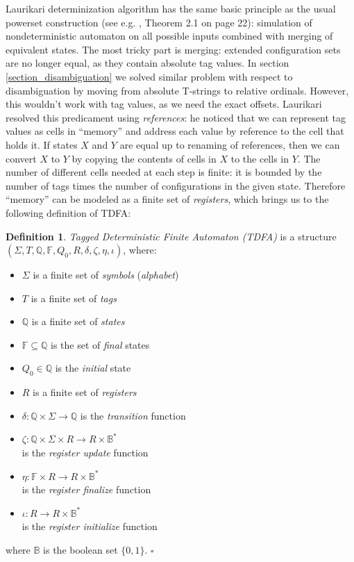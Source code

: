 \documentclass{article}
\newcommand{\YB}{\mathbb{B}}
\newcommand{\YF}{\mathbb{F}}
\newcommand{\YQ}{\mathbb{Q}}
\theoremstyle{definition}
\newtheorem{Xdef}{Definition}
\begin{document}
\begin{multicols}{2}
Laurikari determinization algorithm has the same basic principle as the usual powerset construction (see e.g. \cite{HU90}, Theorem 2.1 on page 22):
simulation of nondeterministic automaton on all possible inputs combined with merging of equivalent states.
The most tricky part is merging: extended configuration sets are no longer equal, as they contain absolute tag values.
In section \ref{section_disambiguation} we solved similar problem with respect to disambiguation
by moving from absolute T-strings to relative ordinals.
However, this wouldn't work with tag values, as we need the exact offsets.
Laurikari resolved this predicament using \emph{references}:
he noticed that we can represent tag values as cells in ``memory'' and address each value by reference to the cell that holds it.
If states $X$ and $Y$ are equal up to renaming of references,
then we can convert $X$ to $Y$ by copying the contents of cells in $X$ to the cells in $Y$.
The number of different cells needed at each step is finite:
it is bounded by the number of tags times the number of configurations in the given state.
Therefore ``memory'' can be modeled as a finite set of \emph{registers},
which brings us to the following definition of TDFA:

    \begin{Xdef}
    \emph{Tagged Deterministic Finite Automaton (TDFA)}
    is a structure $(\Sigma, T, \YQ, \YF, Q_0, R, \delta, \zeta, \eta, \iota)$, where:
    \begin{itemize}
    \setlength{\parskip}{0.5em}
        \item[] $\Sigma$ is a finite set of \emph{symbols} (\emph{alphabet})
        \item[] $T$ is a finite set of \emph{tags}
        \item[] $\YQ$ is a finite set of \emph{states}
        \item[] $\YF \subseteq \YQ$ is the set of \emph{final} states
        \item[] $Q_0 \in \YQ$ is the \emph{initial} state
        \item[] $R$ is a finite set of \emph{registers}
        \item[] $\delta: \YQ \times \Sigma \to \YQ$ is the \emph{transition} function
        \item[] $\zeta: \YQ \times \Sigma \times R \to R \times \YB^*$ \\
            is the \emph{register update} function
        \item[] $\eta: \YF \times R \to R \times \YB^*$ \\
            is the \emph{register finalize} function
        \item[] $\iota: R \to R \times \YB^*$ \\
            is the \emph{register initialize} function
    \end{itemize}
    where $\YB$ is the boolean set $\{0,1\}$.
    $\square$
    \end{Xdef}


\end{multicols}
\end{document}
